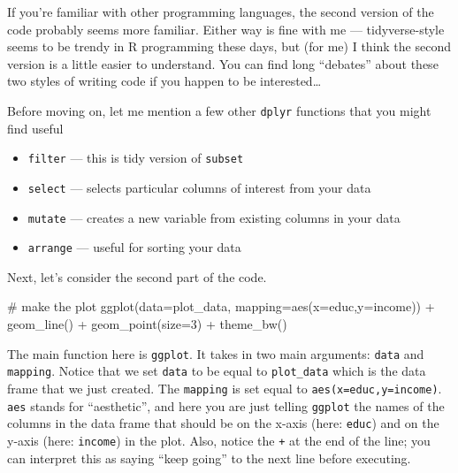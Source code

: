 \documentclass[
  letterpaper,
  DIV=11,
  numbers=noendperiod]{scrreprt}
\newenvironment{Shaded}{\begin{snugshade}}{\end{snugshade}}
\newcommand{\AttributeTok}[1]{\textcolor[rgb]{0.40,0.45,0.13}{#1}}
\newcommand{\CommentTok}[1]{\textcolor[rgb]{0.37,0.37,0.37}{#1}}
\newcommand{\DecValTok}[1]{\textcolor[rgb]{0.68,0.00,0.00}{#1}}
\newcommand{\FunctionTok}[1]{\textcolor[rgb]{0.28,0.35,0.67}{#1}}
\newcommand{\NormalTok}[1]{\textcolor[rgb]{0.00,0.23,0.31}{#1}}
\newcommand{\SpecialCharTok}[1]{\textcolor[rgb]{0.37,0.37,0.37}{#1}}
\begin{document}
If you're familiar with other programming languages, the second version
of the code probably seems more familiar. Either way is fine with me ---
tidyverse-style seems to be trendy in R programming these days, but (for
me) I think the second version is a little easier to understand. You can
find long ``debates'' about these two styles of writing code if you
happen to be interested\ldots{}

Before moving on, let me mention a few other \texttt{dplyr} functions
that you might find useful

\begin{itemize}
\item
  \texttt{filter} --- this is tidy version of \texttt{subset}
\item
  \texttt{select} --- selects particular columns of interest from your
  data
\item
  \texttt{mutate} --- creates a new variable from existing columns in
  your data
\item
  \texttt{arrange} --- useful for sorting your data
\end{itemize}

Next, let's consider the second part of the code.

\begin{Shaded}
\begin{Highlighting}[]
\CommentTok{\# make the plot}
\FunctionTok{ggplot}\NormalTok{(}\AttributeTok{data=}\NormalTok{plot\_data,}
       \AttributeTok{mapping=}\FunctionTok{aes}\NormalTok{(}\AttributeTok{x=}\NormalTok{educ,}\AttributeTok{y=}\NormalTok{income)) }\SpecialCharTok{+}
    \FunctionTok{geom\_line}\NormalTok{() }\SpecialCharTok{+}
    \FunctionTok{geom\_point}\NormalTok{(}\AttributeTok{size=}\DecValTok{3}\NormalTok{) }\SpecialCharTok{+}
    \FunctionTok{theme\_bw}\NormalTok{()}
\end{Highlighting}
\end{Shaded}

The main function here is \texttt{ggplot}. It takes in two main
arguments: \texttt{data} and \texttt{mapping}. Notice that we set
\texttt{data} to be equal to \texttt{plot\_data} which is the data frame
that we just created. The \texttt{mapping} is set equal to
\texttt{aes(x=educ,y=income)}. \texttt{aes} stands for ``aesthetic'',
and here you are just telling \texttt{ggplot} the names of the columns
in the data frame that should be on the x-axis (here: \texttt{educ}) and
on the y-axis (here: \texttt{income}) in the plot. Also, notice the
\texttt{+} at the end of the line; you can interpret this as saying
``keep going'' to the next line before executing.
\end{document}
